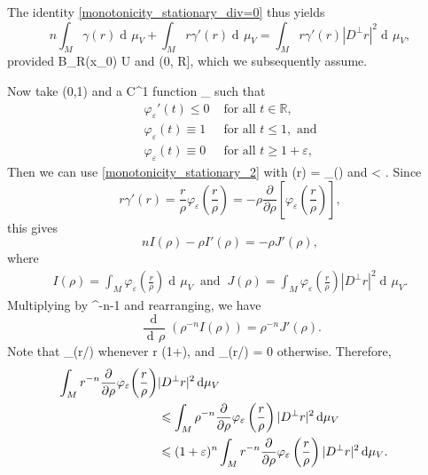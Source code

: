 \documentclass[a4paper, 11pt]{article}
\theoremstyle{plain}
\theoremstyle{definition}
\theoremstyle{remark}
\DeclareMathOperator{\diff}{d \!}
\numberwithin{equation}{subsection}
\def\({}
\def\){}
\begin{document}
The identity \eqref{monotonicity_stationary_div=0} thus yields
\begin{equation}
\label{monotonicity_stationary_2}
n\int_{M} \gamma(r) \diff\mu_{V} + \int_{M}r\gamma'(r) \diff\mu_{V} = \int_{M}r\gamma'(r)|D^{\perp}r|^2 \diff\mu_{V},
\end{equation}
provided \(B_{R}(x_{0}) \subset U\) and \(\rho \in (0, R]\), which we subsequently assume.

Now take \(\varepsilon \in (0,1)\) and a \(C^1\) function \(\varphi_{\varepsilon} \vcentcolon {} \rightarrow [0,1]\) such that
\begin{align}
\varphi_{\varepsilon}'(t) \leqslant 0 &\text{ for all } t \in \mathbb{R}, \\ \varphi_{\varepsilon}(t) \equiv 1 &\text{ for all } t \leqslant 1, \text{ and}  \\ \varphi_{\varepsilon}(t) \equiv 0 &\text{ for all } t \geqslant 1 + \varepsilon,
\end{align}
Then we can use \eqref{monotonicity_stationary_2} with \(\gamma(r) = \varphi_{\varepsilon}\left(\right)\) and \(\rho < \). Since
\begin{equation}
r\gamma'(r) = \frac{r}{\rho}\varphi_{\varepsilon}\left(\frac{r}{\rho}\right) = -\rho \frac{\partial}{\partial\rho}\left[\varphi_{\varepsilon}\left(\frac{r}{\rho}\right)\right],
\end{equation}
this gives
\begin{equation}
nI(\rho) - \rho I'(\rho) = -\rho J'(\rho),
\end{equation}
where
\begin{align}
I(\rho) = \int_{M}\varphi_{\varepsilon}\left(\frac{r}{\rho}\right) \diff\mu_{V} \ \text{ and } \ J(\rho) = \int_{M}\varphi_{\varepsilon}\left(\frac{r}{\rho}\right)|D^{\perp}r|^2 \diff\mu_{V}.
\end{align}
Multiplying by \(\rho^{-n-1}\) and rearranging, we have
\begin{equation}
\label{monotonicity_stationary_3}
\frac{\!\diff}{\diff\rho}(\rho^{-n}I(\rho)) = \rho^{-n}J'(\rho).
\end{equation}
Note that \(\frac{\partial}{\partial\rho}\varphi_{\varepsilon}(r/\rho) \) whenever \(\rho \leqslant r \leqslant (1+\varepsilon)\rho\), and \(\frac{\partial}{\partial\rho}\varphi_{\varepsilon}(r/\rho) = 0\) otherwise. Therefore,
\begin{align}
\int_{M}r^{-n}\frac{\partial}{\partial\rho}\varphi_{\varepsilon}\bigg(\frac{r}{\rho}\bigg)|D^{\perp}r|^{2}\diff\mu_{V} \hspace{-50pt} \\
&\leqslant \int_{M}\rho^{-n}\frac{\partial}{\partial\rho}\varphi_{\varepsilon}\left(\frac{r}{\rho}\right)|D^{\perp}r|^{2}\diff\mu_{V} \\
&\leqslant (1+\varepsilon)^n\int_{M}r^{-n}\frac{\partial}{\partial\rho}\varphi_{\varepsilon}\left(\frac{r}{\rho}\right)|D^{\perp}r|^{2}\diff\mu_{V}.
\end{align}
\end{document}
